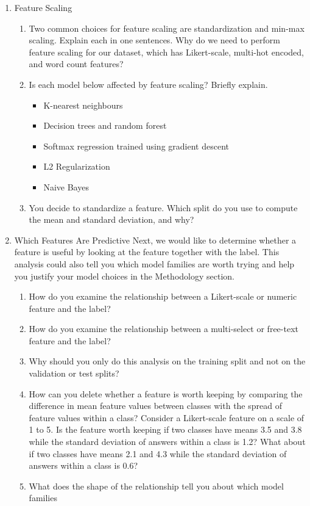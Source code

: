 \documentclass[12pt]{article}
\begin{document}
\begin{enumerate}
\item Feature Scaling
\begin{enumerate}
\item Two common choices for feature scaling are standardization and min-max
scaling. Explain each in one sentences. Why do we need to perform feature scaling
for our dataset, which has Likert-scale, multi-hot encoded, and word count
features?
\item Is each model below affected by feature scaling? Briefly explain.
\begin{itemize}
\item K-nearest neighbours
\item Decision trees and random forest
\item Softmax regression trained using gradient descent
\item L2 Regularization
\item Naive Bayes
\end{itemize}
\item You decide to standardize a feature. Which split do you use to compute the
mean and standard deviation, and why?
\end{enumerate}
\item Which Features Are Predictive
\smallskip
Next, we would like to determine whether a feature is useful by looking at the
feature together with the label. This analysis could also tell you which model
families are worth trying and help you justify your model choices in the
Methodology section.
\smallskip
\begin{enumerate}
\item How do you examine the relationship between a Likert-scale or numeric feature
and the label?
\item How do you examine the relationship between a multi-select or free-text
feature and the label?
\item Why should you only do this analysis on the training split and not on the
validation or test splits?
\item How can you delete whether a feature is worth keeping by comparing the
difference in mean feature values between classes with the spread of feature values
within a class?
\smallskip
Consider a Likert-scale feature on a scale of 1 to 5. Is the feature worth keeping
if two classes have means 3.5 and 3.8 while the standard deviation of answers
within a class is 1.2? What about if two classes have means 2.1 and 4.3 while the
standard deviation of answers within a class is 0.6?
\item What does the shape of the relationship tell you about which model families

\end{enumerate}
\end{enumerate}
\end{document}
